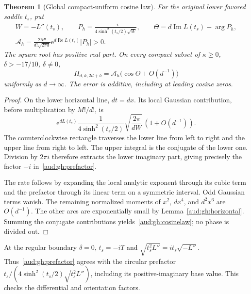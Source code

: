 \documentclass[11pt,a4paper]{article}
\numberwithin{equation}{section}
\newtheorem{theorem}{Theorem}[section]
\begin{document}
\begin{theorem}[Global compact-uniform cosine law]\label{aud:gh:cosine}
For the original lower favored saddle $t_s$, put
\begin{gather}
 W=-L''(t_s),\qquad
 P_h=\frac{-i}{4\sinh^2(t_s/2)\sqrt W},\qquad
 \Theta=d\operatorname{Im}L(t_s)+\arg P_h,\label{aud:gh:prefactor}\\
 \mathcal A_h=\frac{2M!}{d!\sqrt{2\pi d}}
                   \mathrm e^{d\operatorname{Re}L(t_s)}|P_h|>0.
\end{gather}
The square root has positive real part. On every compact subset of
$\kappa\ge0$, $\delta>-17/10$, $\delta\ne0$,
\begin{equation}\label{aud:gh:cosinelaw}
 H_{d,k,2d+b}=\mathcal A_h\bigl(\cos\Theta+O(d^{-1})\bigr)
\end{equation}
uniformly as $d\to\infty$. The error is additive, including at leading cosine zeros.
\end{theorem}
\begin{proof}
On the lower horizontal line, $dt=dx$. Its local Gaussian contribution, before multiplication by $M!/d!$, is
\[
 \mathrm e^{dL(t_s)}\frac{1}{4\sinh^2(t_s/2)}
                       \sqrt{\frac{2\pi}{dW}}\,(1+O(d^{-1})).
\]
The counterclockwise rectangle traverses the lower line from left to right and the upper line from right to left. The upper integral is the conjugate of the lower one. Division by $2\pi i$ therefore extracts the lower imaginary part, giving precisely the factor $-i$ in~\eqref{aud:gh:prefactor}.

The rate follows by expanding the local analytic exponent through its cubic term and the prefactor through its linear term on a symmetric interval. Odd Gaussian terms vanish. The remaining normalized moments of $x^2$, $dx^4$, and $d^2x^6$ are $O(d^{-1})$. The other arcs are exponentially small by Lemma~\ref{aud:gh:horizontal}. Summing the conjugate contributions yields~\eqref{aud:gh:cosinelaw}; no phase is divided out.
\end{proof}

At the regular boundary $\delta=0$, $t_s=-iT$ and
$\sqrt{t_s^2L''}=it_s\sqrt{-L''}$. Thus~\eqref{aud:gh:prefactor} agrees with the circular prefactor $t_s/(4\sinh^2(t_s/2)\sqrt{t_s^2L''})$, including its positive-imaginary base value. This checks the differential and orientation factors.
\end{document}
